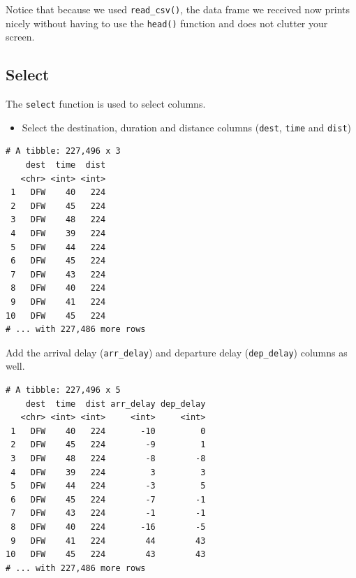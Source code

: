 \documentclass[]{article}
\newenvironment{Shaded}{\begin{snugshade}}{\end{snugshade}}
\newcommand{\KeywordTok}[1]{\textcolor[rgb]{0.13,0.29,0.53}{\textbf{{#1}}}}
\newcommand{\StringTok}[1]{\textcolor[rgb]{0.31,0.60,0.02}{{#1}}}
\newcommand{\NormalTok}[1]{{#1}}
\providecommand{\tightlist}{%
  \setlength{\itemsep}{0pt}\setlength{\parskip}{0pt}}
\theoremstyle{definition}
\theoremstyle{definition}
\theoremstyle{definition}
\theoremstyle{remark}
\begin{document}
Notice that because we used \texttt{read\_csv()}, the data frame we
received now prints nicely without having to use the \texttt{head()}
function and does not clutter your screen.

\subsection{Select}\label{select}

The \texttt{select} function is used to select columns.

\begin{itemize}
\tightlist
\item
  Select the destination, duration and distance columns (\texttt{dest},
  \texttt{time} and \texttt{dist})
\end{itemize}

\begin{Shaded}
\end{Shaded}

\begin{verbatim}
# A tibble: 227,496 x 3
    dest  time  dist
   <chr> <int> <int>
 1   DFW    40   224
 2   DFW    45   224
 3   DFW    48   224
 4   DFW    39   224
 5   DFW    44   224
 6   DFW    45   224
 7   DFW    43   224
 8   DFW    40   224
 9   DFW    41   224
10   DFW    45   224
# ... with 227,486 more rows
\end{verbatim}

Add the arrival delay (\texttt{arr\_delay}) and departure delay
(\texttt{dep\_delay}) columns as well.

\begin{Shaded}
\end{Shaded}

\begin{verbatim}
# A tibble: 227,496 x 5
    dest  time  dist arr_delay dep_delay
   <chr> <int> <int>     <int>     <int>
 1   DFW    40   224       -10         0
 2   DFW    45   224        -9         1
 3   DFW    48   224        -8        -8
 4   DFW    39   224         3         3
 5   DFW    44   224        -3         5
 6   DFW    45   224        -7        -1
 7   DFW    43   224        -1        -1
 8   DFW    40   224       -16        -5
 9   DFW    41   224        44        43
10   DFW    45   224        43        43
# ... with 227,486 more rows
\end{verbatim}
\end{document}
